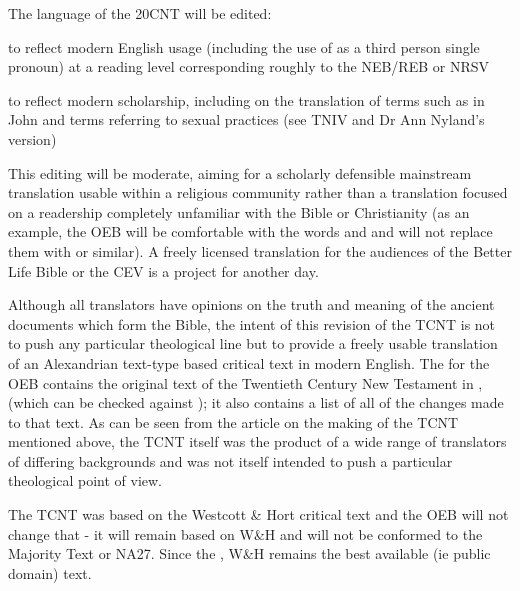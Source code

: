 
The language of the 20CNT will be edited:

\startitemize
\item
  to reflect modern English usage (including the use of 
  as a third person single pronoun) at a reading level corresponding
  roughly to the NEB/REB or NRSV
\item
  to reflect modern scholarship, including on the translation of
  terms such as  in John and terms referring to
  sexual practices (see TNIV and Dr Ann Nyland's version)
\stopitemize

This editing will be moderate, aiming for a scholarly defensible
mainstream translation usable within a religious community rather
than a translation focused on a readership completely unfamiliar
with the Bible or Christianity (as an example, the OEB will be
comfortable with the words  and  and
will not replace them with  or similar). A
freely licensed translation for the audiences of the Better Life
Bible or the CEV is a project for another day.


Although all translators have opinions on the truth and meaning of
the ancient documents which form the Bible, the intent of this
revision of the TCNT is not to push any particular theological line
but to provide a freely usable translation of an Alexandrian
text-type based critical text in modern English. The
\from[1] for the OEB contains the
original text of the Twentieth Century New Testament in
\from[2], (which can be
checked against
\from[3]);
it also contains a list of all of the changes made to that text. As
can be seen from the article on the making of the TCNT mentioned
above, the TCNT itself was the product of a wide range of
translators of differing backgrounds and was not itself intended to
push a particular theological point of view.


The TCNT was based on the Westcott \& Hort critical text and the
OEB will not change that - it will remain based on W\&H and will
not be conformed to the Majority Text or NA27. Since the
\from[4],
W\&H remains the best available (ie public domain) text.

